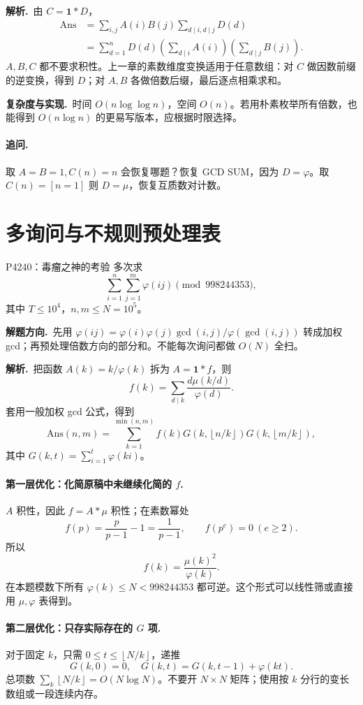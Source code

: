 \documentclass[UTF8,a4paper,11pt,oneside,openany,fontset=fandol]{ctexbook}
\theoremstyle{definition}
\newcommand{\one}{\mathbf 1}
\newcommand{\floor}[1]{\left\lfloor #1\right\rfloor}
\newcommand{\sol}{\par\noindent\textbf{解析.}\ }
\newcommand{\hint}{\par\noindent\textbf{解题方向.}\ }
\newcommand{\cost}{\par\noindent\textbf{复杂度与实现.}\ }
\begin{document}
\sol 由 $C=\one*D$，
\[
\begin{aligned}
\mathrm{Ans}
&=\sum_{i,j}A(i)B(j)\sum_{d\mid i,d\mid j}D(d)\\
&=\sum_{d=1}^nD(d)
 \left(\sum_{d\mid i}A(i)\right)
 \left(\sum_{d\mid j}B(j)\right).
\end{aligned}
\]
$A,B,C$ 都不要求积性。上一章的素数维度变换适用于任意数组：对 $C$ 做因数前缀的逆变换，得到 $D$；对 $A,B$ 各做倍数后缀，最后逐点相乘求和。
\cost 时间 $O(n\log\log n)$，空间 $O(n)$。若用朴素枚举所有倍数，也能得到 $O(n\log n)$ 的更易写版本，应根据时限选择。
\paragraph{追问.} 取 $A=B=1,C(n)=n$ 会恢复哪题？恢复 GCD SUM，因为 $D=\varphi$。取 $C(n)=[n=1]$ 则 $D=\mu$，恢复互质数对计数。


\section{多询问与不规则预处理表}
\begin{problem}{P4240：毒瘤之神的考验}
多次求
\[
 \sum_{i=1}^n\sum_{j=1}^m\varphi(ij)\pmod{998244353},
\]
其中 $T\le10^4$，$n,m\le N=10^5$。
\end{problem}
\hint 先用 $\varphi(ij)=\varphi(i)\varphi(j)\gcd(i,j)/\varphi(\gcd(i,j))$ 转成加权 gcd；再预处理倍数方向的部分和。不能每次询问都做 $O(N)$ 全扫。

\sol 把函数 $A(k)=k/\varphi(k)$ 拆为 $A=\one*f$，则
\[
 f(k)=\sum_{d\mid k}\frac{d\mu(k/d)}{\varphi(d)}.
\]
套用一般加权 gcd 公式，得到
\[
\boxed{\mathrm{Ans}(n,m)=\sum_{k=1}^{\min(n,m)}f(k)
G\left(k,\floor{n/k}\right)G\left(k,\floor{m/k}\right)},
\]
其中 $G(k,t)=\sum_{i=1}^t\varphi(ki)$。

\paragraph{第一层优化：化简原稿中未继续化简的 $f$.}
$A$ 积性，因此 $f=A*\mu$ 积性；在素数幂处
\[
 f(p)=\frac p{p-1}-1=\frac1{p-1},\qquad
 f(p^e)=0\ (e\ge2).
\]
所以
\[
 f(k)=\frac{\mu(k)^2}{\varphi(k)}.
\]
在本题模数下所有 $\varphi(k)\le N<998244353$ 都可逆。这个形式可以线性筛或直接用 $\mu,\varphi$ 表得到。

\paragraph{第二层优化：只存实际存在的 $G$ 项.}
对于固定 $k$，只需 $0\le t\le\floor{N/k}$，递推
\[
 G(k,0)=0,\quad G(k,t)=G(k,t-1)+\varphi(kt).
\]
总项数 $\sum_k\floor{N/k}=O(N\log N)$。不要开 $N\times N$ 矩阵；使用按 $k$ 分行的变长数组或一段连续内存。
\end{document}
